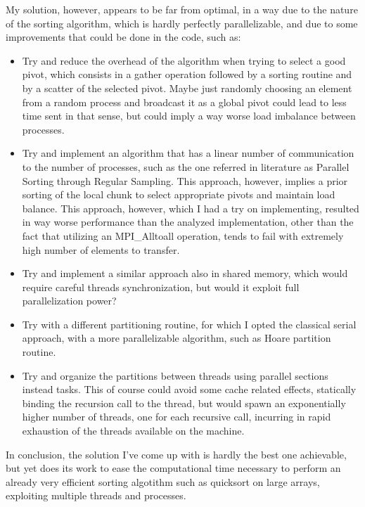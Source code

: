 \documentclass{article}
\begin{document}
	My solution, however, appears to be far from optimal, in a way due to the nature of the sorting algorithm, which is hardly perfectly parallelizable, and due to some improvements that could be done in the code, such as:
	\begin{itemize}
		\item Try and reduce the overhead of the algorithm when trying to select a good pivot, which consists in a gather operation followed by a sorting routine and by a scatter of the selected pivot. Maybe just randomly choosing an element from a random process and broadcast it as a global pivot could lead to less time sent in that sense, but could imply a way worse load imbalance between processes.
		\item Try and implement an algorithm that has a linear number of communication to the number of processes, such as the one referred in literature as Parallel Sorting through Regular Sampling. This approach, however, implies a prior sorting of the local chunk to select appropriate pivots and maintain load balance. This approach, however, which I had a try on implementing, resulted in way worse performance than the analyzed implementation, other than the fact that utilizing an MPI\_Alltoall operation, tends to fail with extremely high number of elements to transfer.
		\item Try and implement a similar approach also in shared memory, which would require careful threads synchronization, but would it exploit full parallelization power?
		\item Try with a different partitioning routine, for which I opted the classical serial approach, with a more parallelizable algorithm, such as Hoare partition routine.
		\item Try and organize the partitions between threads using parallel sections instead tasks. This of course could avoid some cache related effects, statically binding the recursion call to the thread, but would spawn an exponentially higher number of threads, one for each recursive call, incurring in rapid exhaustion of the threads available on the machine.
	\end{itemize}
	
	In conclusion, the solution I've come up with is hardly the best one achievable, but yet does its work to ease the computational time necessary to perform an already very efficient sorting algotithm such as quicksort on large arrays, exploiting multiple threads and processes.
	
	\newpage
	
	
	 
\end{document}

